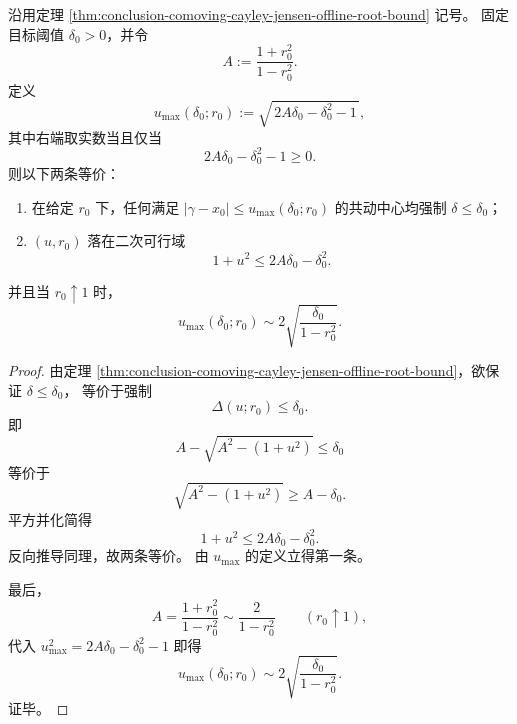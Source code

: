 \begin{theorem}\label{thm:conclusion-comoving-cayley-jensen-pareto-feasible-region}
沿用定理 \ref{thm:conclusion-comoving-cayley-jensen-offline-root-bound} 记号。
固定目标阈值 \(\delta_0>0\)，并令
\[
A:=\frac{1+r_0^2}{1-r_0^2}.
\]
定义
\[
u_{\max}(\delta_0;r_0):=
\sqrt{\,2A\delta_0-\delta_0^2-1\,},
\]
其中右端取实数当且仅当
\[
2A\delta_0-\delta_0^2-1\ge 0.
\]
则以下两条等价：
\begin{enumerate}
  \item 在给定 \(r_0\) 下，任何满足 \(|\gamma-x_0|\le u_{\max}(\delta_0;r_0)\) 的共动中心均强制 \(\delta\le \delta_0\)；
  \item \((u,r_0)\) 落在二次可行域
  \[
  1+u^2\le 2A\delta_0-\delta_0^2.
  \]
\end{enumerate}
并且当 \(r_0\uparrow 1\) 时，
\[
u_{\max}(\delta_0;r_0)\sim 2\sqrt{\frac{\delta_0}{1-r_0^2}}.
\]
\end{theorem}
\begin{proof}
由定理 \ref{thm:conclusion-comoving-cayley-jensen-offline-root-bound}，欲保证 \(\delta\le\delta_0\)，
等价于强制
\[
\Delta(u;r_0)\le\delta_0.
\]
即
\[
A-\sqrt{A^2-(1+u^2)}\le \delta_0
\]
等价于
\[
\sqrt{A^2-(1+u^2)}\ge A-\delta_0.
\]
平方并化简得
\[
1+u^2\le 2A\delta_0-\delta_0^2.
\]
反向推导同理，故两条等价。
由 \(u_{\max}\) 的定义立得第一条。

最后，
\[
A=\frac{1+r_0^2}{1-r_0^2}\sim \frac{2}{1-r_0^2}\qquad(r_0\uparrow 1),
\]
代入
\(
u_{\max}^2=2A\delta_0-\delta_0^2-1
\)
即得
\[
u_{\max}(\delta_0;r_0)\sim 2\sqrt{\frac{\delta_0}{1-r_0^2}}.
\]
证毕。
\end{proof}

